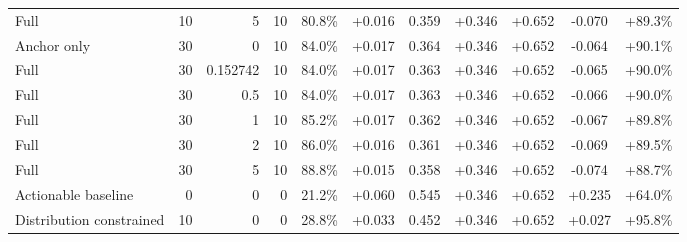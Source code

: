 \begin{table}[htbp]
\begin{tabular}{lrrrccccccc}
Full & 10 & 5 & 10 & 80.8\% & +0.016 & 0.359 & +0.346 & +0.652 & -0.070 & +89.3\% \\
Anchor only & 30 & 0 & 10 & 84.0\% & +0.017 & 0.364 & +0.346 & +0.652 & -0.064 & +90.1\% \\
Full & 30 & 0.152742 & 10 & 84.0\% & +0.017 & 0.363 & +0.346 & +0.652 & -0.065 & +90.0\% \\
Full & 30 & 0.5 & 10 & 84.0\% & +0.017 & 0.363 & +0.346 & +0.652 & -0.066 & +90.0\% \\
Full & 30 & 1 & 10 & 85.2\% & +0.017 & 0.362 & +0.346 & +0.652 & -0.067 & +89.8\% \\
Full & 30 & 2 & 10 & 86.0\% & +0.016 & 0.361 & +0.346 & +0.652 & -0.069 & +89.5\% \\
Full & 30 & 5 & 10 & 88.8\% & +0.015 & 0.358 & +0.346 & +0.652 & -0.074 & +88.7\% \\
Actionable baseline & 0 & 0 & 0 & 21.2\% & +0.060 & 0.545 & +0.346 & +0.652 & +0.235 & +64.0\% \\
Distribution constrained & 10 & 0 & 0 & 28.8\% & +0.033 & 0.452 & +0.346 & +0.652 & +0.027 & +95.8\% \\
\bottomrule
\end{tabular}
\end{table}